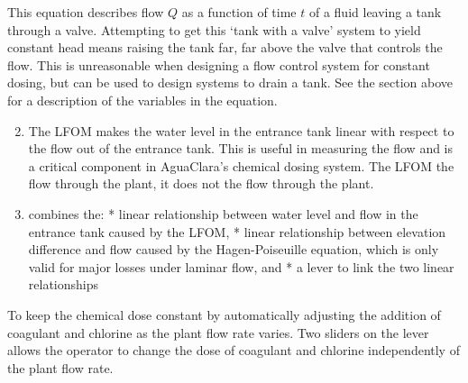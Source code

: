 \documentclass[letterpaper,10pt,english]{sphinxmanual}
\begin{document}
%
\begin{sphinxVerbatim}[commandchars=\\\{\}]
\PYGZbs{}    \PYGZbs{} \PYGZbs{} \PYGZbs{}
\end{sphinxVerbatim}

This equation describes flow \(Q\) as a function of time \(t\) of a fluid leaving a tank through a valve. Attempting to get this ‘tank with a valve’ system to yield constant head means raising the tank far, far above the valve that controls the flow. This is unreasonable when designing a flow control system for constant dosing, but can be used to design systems to drain a tank. See the section above for a description of the variables in the equation.
\begin{enumerate}
\setcounter{enumi}{1}
\item {} 
 The LFOM makes the water level in the entrance tank linear with respect to the flow out of the entrance tank. This is useful in measuring the flow and is a critical component in AguaClara’s chemical dosing system. The LFOM  the flow through the plant, it does not  the flow through the plant.

\item {} 
 combines the:
* linear relationship between water level and flow in the entrance tank caused by the LFOM,
* linear relationship between elevation difference and flow caused by the Hagen-Poiseuille equation, which is only valid for major losses under laminar flow, and
* a lever to link the two linear relationships

\end{enumerate}

To keep the chemical dose constant by automatically adjusting the addition of coagulant and chlorine as the plant flow rate varies. Two sliders on the lever allows the operator to change the dose of coagulant and chlorine independently of the plant flow rate.
\end{document}
